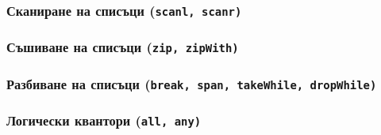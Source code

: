 \documentclass{beamer}
\begin{document}
\begin{frame}
  \frametitle{Сканиране на списъци (\tt{scanl}, \tt{scanr})}

\end{frame}


\begin{frame}
  \frametitle{Съшиване на списъци (\tt{zip}, \tt{zipWith})}

\end{frame}

\begin{frame}
  \frametitle{Разбиване на списъци (\tt{break}, \tt{span}, \tt{takeWhile}, \tt{dropWhile})}

\end{frame}

\begin{frame}
  \frametitle{Логически квантори (\tt{all}, \tt{any})}

\end{frame}
\end{document}
